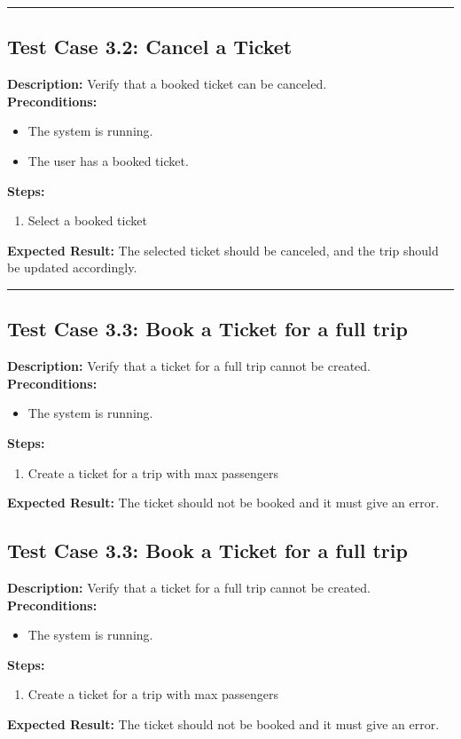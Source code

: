 \documentclass{article}
\begin{document}
\bigskip
\hrule
\bigskip

\subsection{Test Case 3.2: Cancel a Ticket}

\textbf{Description:} Verify that a booked ticket can be canceled.\\
\textbf{Preconditions:}
\begin{itemize}
  \item The system is running.
  \item The user has a booked ticket.
\end{itemize}
\textbf{Steps:}
\begin{enumerate}
  \item Select a booked ticket
\end{enumerate}
\textbf{Expected Result:} The selected ticket should be canceled, and the trip should be updated accordingly.

\bigskip
\hrule
\bigskip

\subsection{Test Case 3.3: Book a Ticket for a full trip}

\textbf{Description:} Verify that a ticket for a full trip cannot be created.\\
\textbf{Preconditions:}
\begin{itemize}
  \item The system is running.
\end{itemize}
\textbf{Steps:}
\begin{enumerate}
  \item Create a ticket for a trip with max passengers
\end{enumerate}
\textbf{Expected Result:} The ticket should not be booked and it must give an error.

\pagebreak

\subsection{Test Case 3.3: Book a Ticket for a full trip}

\textbf{Description:} Verify that a ticket for a full trip cannot be created.\\
\textbf{Preconditions:}
\begin{itemize}
  \item The system is running.
\end{itemize}
\textbf{Steps:}
\begin{enumerate}
  \item Create a ticket for a trip with max passengers
\end{enumerate}
\textbf{Expected Result:} The ticket should not be booked and it must give an error.
\end{document}
